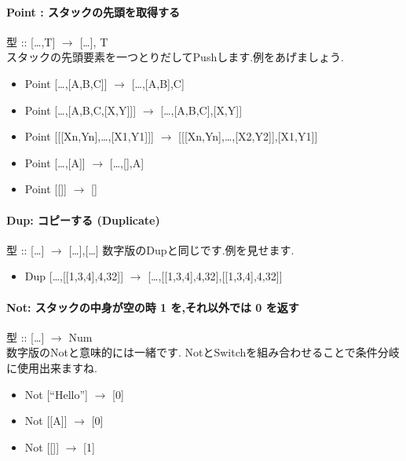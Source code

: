 \paragraph{Point : スタックの先頭を取得する}

型 :: {[}\ldots{},T{]} $\to$ {[}\ldots{}{]},
T\\スタックの先頭要素を一つとりだしてPushします.例をあげましょう.

\begin{itemize}
\item
  Point {[}\ldots{},{[}A,B,C{]}{]} $\to$
  {[}\ldots{},{[}A,B{]},C{]}
\item
  Point {[}\ldots{},{[}A,B,C,{[}X,Y{]}{]}{]} $\to$
  {[}\ldots{},{[}A,B,C{]},{[}X,Y{]}{]}
\item
  Point {[}{[}{[}Xn,Yn{]},\ldots{},{[}X1,Y1{]}{]}{]} $\to$
  {[}{[}{[}Xn,Yn{]},\ldots{},{[}X2,Y2{]}{]},{[}X1,Y1{]}{]}
\item
  Point {[}\ldots{},{[}A{]}{]} $\to$ {[}\ldots{},{[}{]},A{]}
\item
  Point {[}{[}{]}{]} $\to$ {[}{]}
\end{itemize}

\paragraph{Dup: コピーする (Duplicate)}

型 :: {[}\ldots{}{]} $\to$ {[}\ldots{}{]},{[}\ldots{}{]}
数字版のDupと同じです.例を見せます.

\begin{itemize}
\item
  Dup {[}\ldots{},{[}{[}1,3,4{]},4,32{]}{]} $\to$
  {[}\ldots{},{[}{[}1,3,4{]},4,32{]},{[}{[}1,3,4{]},4,32{]}{]}
\end{itemize}

\paragraph{Not: スタックの中身が空の時 1 を,それ以外では 0 を返す}

型 :: {[}\ldots{}{]} $\to$
Num\\数字版のNotと意味的には一緒です.
NotとSwitchを組み合わせることで条件分岐に使用出来ますね.

\begin{itemize}
\item
  Not {[}``Hello''{]} $\to$ {[}0{]}
\item
  Not {[}{[}A{]}{]} $\to$ {[}0{]}
\item
  Not {[}{[}{]}{]} $\to$ {[}1{]}
\end{itemize}

